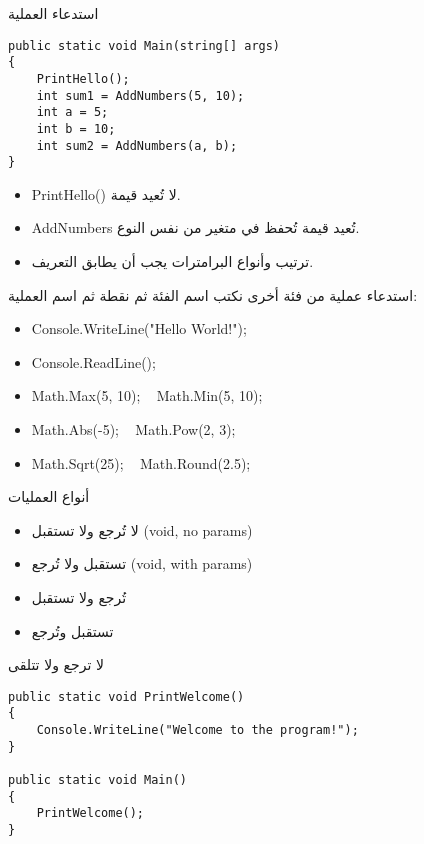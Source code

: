 \documentclass[13pt]{beamer}
\begin{document}
\begin{frame}[fragile]{استدعاء العملية}
\begin{english}
\begin{lstlisting}[language=CSharp]
public static void Main(string[] args)
{
    PrintHello();
    int sum1 = AddNumbers(5, 10);
    int a = 5;
    int b = 10;
    int sum2 = AddNumbers(a, b);
}
\end{lstlisting}
\end{english}
\vspace{0.5em}
\begin{itemize}
  \item \textenglish{PrintHello()} لا تُعيد قيمة.
  \item \textenglish{AddNumbers} تُعيد قيمة تُحفظ في متغير من نفس النوع.
  \item ترتيب وأنواع البرامترات يجب أن يطابق التعريف.
\end{itemize}
\end{frame}

\begin{frame}[fragile]{استدعاء عملية من فئة أخرى}
نكتب اسم الفئة ثم نقطة ثم اسم العملية:
\begin{itemize}
  \item \textenglish{Console.WriteLine("Hello World!");}
  \item \textenglish{Console.ReadLine();}
  \item \textenglish{Math.Max(5, 10); ~ Math.Min(5, 10);}
  \item \textenglish{Math.Abs(-5); ~ Math.Pow(2, 3);}
  \item \textenglish{Math.Sqrt(25); ~ Math.Round(2.5);}
\end{itemize}
\end{frame}

\begin{frame}[fragile]{أنواع العمليات}
\begin{itemize}
  \item لا تُرجع ولا تستقبل \textenglish{(void, no params)}
  \item تستقبل ولا تُرجع \textenglish{(void, with params)}
  \item تُرجع ولا تستقبل
  \item تستقبل وتُرجع
\end{itemize}
\end{frame}

\begin{frame}[fragile]{لا ترجع ولا تتلقى}
\begin{english}
\begin{lstlisting}[language=CSharp]
public static void PrintWelcome()
{
    Console.WriteLine("Welcome to the program!");
}

public static void Main()
{
    PrintWelcome();
}
\end{lstlisting}
\end{english}
\end{frame}
\end{document}
